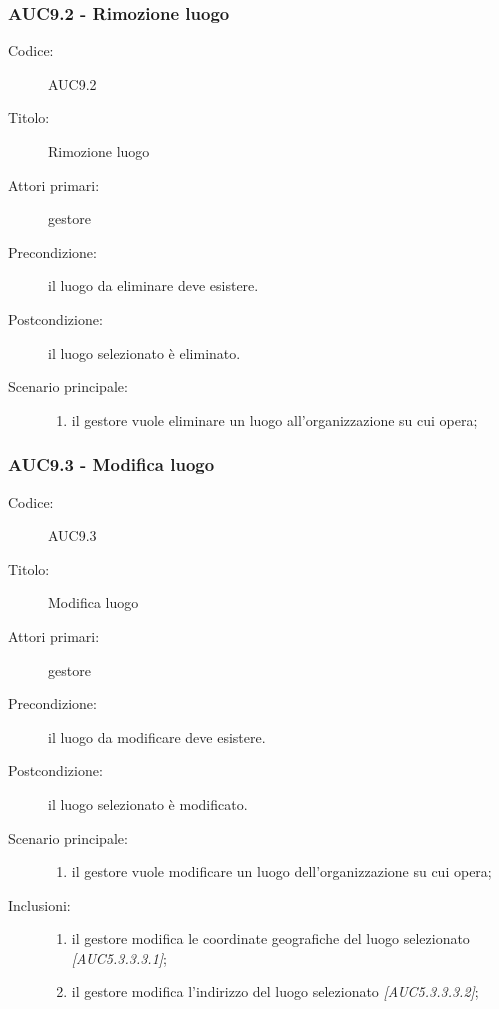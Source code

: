 \documentclass[../analisi-dei-requisiti.tex]{subfiles}
\begin{document}
\subsubsection{AUC9.2 - Rimozione luogo}%
\label{subsub:AUC9.2}
\begin{description}
  \item[Codice:] AUC9.2
  \item[Titolo:] Rimozione luogo
  \item[Attori primari:] gestore
  \item[Precondizione:] il luogo da eliminare deve esistere.
  \item[Postcondizione:] il luogo selezionato è eliminato.
  \item[Scenario principale:]
  \begin{enumerate}
    \item il gestore vuole eliminare un luogo all'organizzazione su cui opera;
  \end{enumerate}
\end{description}

\subsubsection{AUC9.3 - Modifica luogo}%
\label{subsub:AUC9.3}
\begin{description}
  \item[Codice:] AUC9.3
  \item[Titolo:] Modifica luogo
  \item[Attori primari:] gestore
  \item[Precondizione:] il luogo da modificare deve esistere.
  \item[Postcondizione:] il luogo selezionato è modificato.
  \item[Scenario principale:]
  \begin{enumerate}
    \item il gestore vuole modificare un luogo dell'organizzazione su cui opera;
  \end{enumerate}
  \item[Inclusioni:]
  \begin{enumerate}
    \item il gestore modifica le coordinate geografiche del luogo selezionato \emph{[AUC5.3.3.3.1]};
    \item il gestore modifica l'indirizzo del luogo selezionato \emph{[AUC5.3.3.3.2]};
  \end{enumerate}
\end{description}
\end{document}
